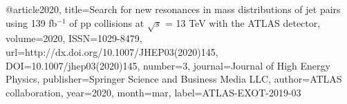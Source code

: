 @article{2020, 
    title={Search for new resonances in mass distributions of jet pairs using 139 fb$^{-1}$ of pp collisions at $ \sqrt{s} $ = 13 TeV with the ATLAS detector}, 
    volume={2020}, 
    ISSN={1029-8479}, 
    url={http://dx.doi.org/10.1007/JHEP03(2020)145}, 
    DOI={10.1007/jhep03(2020)145}, 
    number={3}, 
    journal={Journal of High Energy Physics}, 
    publisher={Springer Science and Business Media LLC}, 
    author={ATLAS collaboration}, 
    year={2020}, 
    month=mar,
    label={ATLAS-EXOT-2019-03}
}

